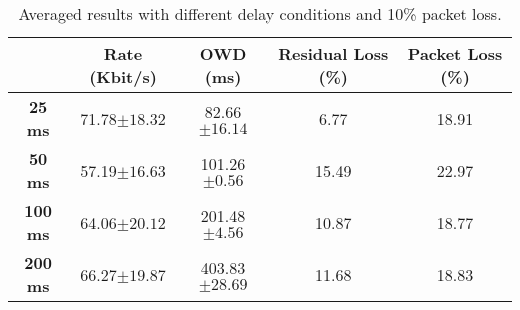 \documentclass[11pt]{amsart}
\begin{document}
\begin{table}[h]
\begin{center}
\begin{tabular}{ |c|c|c|c|c| }
\hline
 & \textbf{Rate (Kbit/s)}  & \textbf{OWD (ms)} & \textbf{Residual Loss (\%)} & \textbf{Packet Loss (\%)}\\ \hline
 \textbf{25 ms} & 71.78$\pm18.32$ &  82.66$\pm16.14$ & 6.77 & 18.91 \\ \hline
 \textbf{50 ms} & 57.19$\pm16.63$ & 101.26$\pm0.56$ & 15.49 & 22.97 \\ \hline
 \textbf{100 ms} &  64.06$\pm20.12$ & 201.48$\pm4.56$ & 10.87 & 18.77 \\ \hline
 \textbf{200 ms} &  66.27$\pm19.87$ & 403.83$\pm28.69$ & 11.68 & 18.83 \\ \hline
\end{tabular}
    \caption[Averaged results with different delay conditions and 10\% packet loss]{Averaged results with different delay conditions and 10\% packet loss.}
\end{center}
\end{table}
\end{document}
